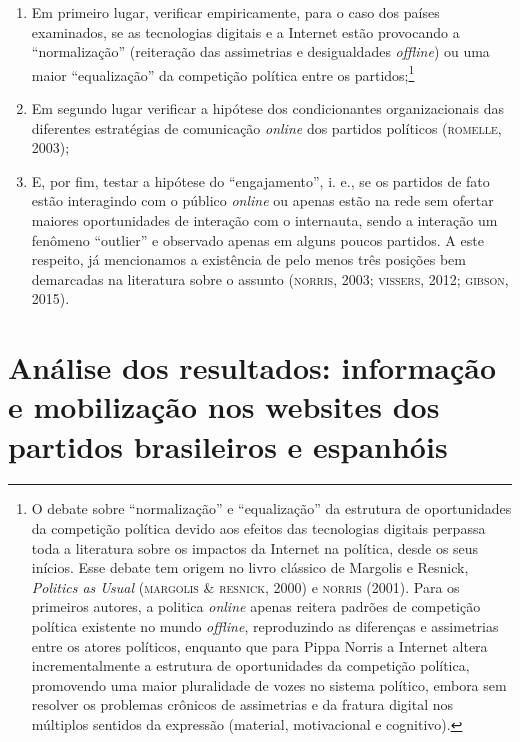 \begin{enumerate}
\item Em primeiro lugar, verificar empiricamente, para o caso dos países
examinados, se as tecnologias digitais e a Internet estão provocando a
``normalização'' (reiteração das assimetrias e desigualdades \emph{offline})
ou uma maior ``equalização'' da competição política entre os
partidos;\footnote{O debate sobre ``normalização'' e ``equalização'' da
  estrutura de oportunidades da competição política devido aos efeitos
  das tecnologias digitais perpassa toda a literatura sobre os impactos
  da Internet na política, desde os seus inícios. Esse debate tem origem
  no livro clássico de Margolis e Resnick, \emph{Politics as Usual}
  (\textsc{margolis \& resnick}, 2000) e \textsc{norris} (2001). Para os primeiros
  autores, a politica \emph{online} apenas reitera padrões de competição
  política existente no mundo \emph{offline}, reproduzindo as diferenças
  e assimetrias entre os atores políticos, enquanto que para Pippa
  Norris a Internet altera incrementalmente a estrutura de oportunidades
  da competição política, promovendo uma maior pluralidade de vozes no
  sistema político, embora sem resolver os problemas crônicos de
  assimetrias e da fratura digital nos múltiplos sentidos da expressão
  (material, motivacional e cognitivo).}

\item Em segundo lugar verificar a hipótese dos condicionantes
organizacionais das diferentes estratégias de comunicação \emph{online} dos
partidos políticos (\textsc{romelle}, 2003);

\item E, por fim, testar a hipótese do ``engajamento'', i. e., se os
partidos de fato estão interagindo com o público \emph{online} ou apenas estão
na rede sem ofertar maiores oportunidades de interação com o internauta,
sendo a interação um fenômeno ``outlier'' e observado apenas em alguns
poucos partidos. A este respeito, já mencionamos a existência de pelo
menos três posições bem demarcadas na literatura sobre o assunto
(\textsc{norris}, 2003; \textsc{vissers}, 2012; \textsc{gibson}, 2015).
\end{enumerate}

\section{Análise dos resultados: informação e mobilização nos websites dos
partidos brasileiros e espanhóis}

